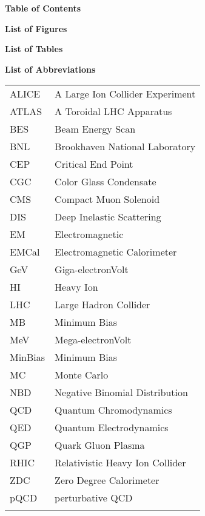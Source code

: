 \documentclass[12pt]{article}
\begin{document}
\newpage
\centerline{\bf{Table of Contents}}
\tableofcontents

\newpage
\centerline{\bf{List of Figures}}
\vspace*{4\baselineskip}
\listoffigures

\newpage
\centerline{\bf{List of Tables}}
\vspace*{4\baselineskip}
\listoftables

\newpage
\centerline{\bf{List of Abbreviations}}
\vspace*{4\baselineskip}
\begin{table}[H]
\large
\begin{tabular}{ll}
ALICE & A Large Ion Collider Experiment \\
ATLAS & A Toroidal LHC Apparatus \\
BES & Beam Energy Scan \\
BNL & Brookhaven National Laboratory \\
CEP & Critical End Point \\
CGC & Color Glass Condensate \\
CMS & Compact Muon Solenoid \\
DIS & Deep Inelastic Scattering \\
EM & Electromagnetic \\
EMCal & Electromagnetic Calorimeter \\
GeV & Giga-electronVolt \\
HI & Heavy Ion \\
LHC & Large Hadron Collider \\
MB & Minimum Bias \\
MeV & Mega-electronVolt \\
MinBias & Minimum Bias \\
MC & Monte Carlo \\
NBD & Negative Binomial Distribution \\
QCD & Quantum Chromodynamics \\
QED & Quantum Electrodynamics \\
QGP & Quark Gluon Plasma \\
RHIC & Relativistic Heavy Ion Collider \\
ZDC & Zero Degree Calorimeter \\
pQCD & perturbative QCD \\
 &
\end{tabular}
\end{table}

\end{document}
